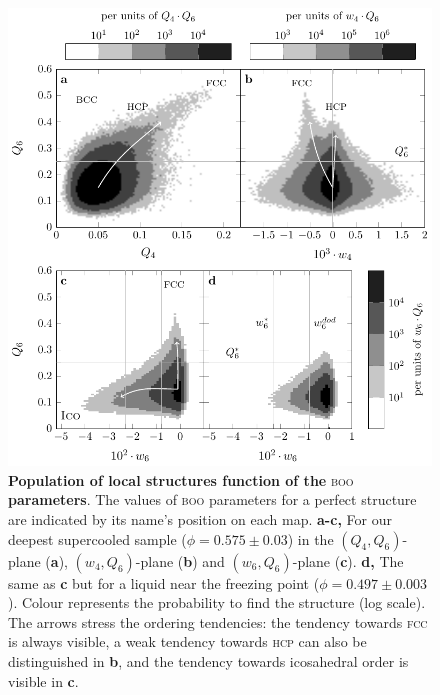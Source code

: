\clearpage

\begin{figure}
\begin{center}
\includegraphics{generate_figures-figure1.pdf}
\end{center}
\caption{\textbf{Population of local structures function of the }\textsc{boo}\textbf{ parameters}. The values of \textsc{boo} parameters for a perfect structure are indicated by its name's position on each map. {\bf a-c,} For our deepest supercooled sample ($\phi=0.575\pm 0.03$) in the $(Q_4,Q_6)$-plane ({\bf a}), $(w_4,Q_6)$-plane ({\bf b}) and $(w_6,Q_6)$-plane ({\bf c}). {\bf d,} The same as {\bf c} but for a liquid near the freezing point ($\phi = 0.497 \pm 0.003$). Colour represents the probability to find the structure (log scale). The arrows stress the ordering tendencies: the tendency towards \textsc{fcc} is always visible, a weak tendency towards \textsc{hcp} can also be distinguished in {\bf b}, and the tendency towards icosahedral order is visible in {\bf c}.}
	\label{fig:maps}
\end{figure}

\clearpage

